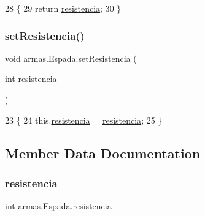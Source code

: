 \begin{DoxyCode}
28     \{
29         \textcolor{keywordflow}{return} \mbox{\hyperlink{classarmas_1_1_espada_a0d0a80a30cfd584c2b50023017919039}{resistencia}};
30     \}
\end{DoxyCode}
\mbox{\label{classarmas_1_1_espada_a276f1d1418d8e991cf3a066d908d9a34}} 
\subsubsection{\texorpdfstring{set\+Resistencia()}{setResistencia()}}
{\footnotesize\ttfamily void armas.\+Espada.\+set\+Resistencia (\begin{DoxyParamCaption}\item[{int}]{resistencia }\end{DoxyParamCaption})\hspace{0.3cm}{\ttfamily [inline]}}


\begin{DoxyCode}
23     \{
24         this.\mbox{\hyperlink{classarmas_1_1_espada_a0d0a80a30cfd584c2b50023017919039}{resistencia}} = \mbox{\hyperlink{classarmas_1_1_espada_a0d0a80a30cfd584c2b50023017919039}{resistencia}};
25     \}
\end{DoxyCode}


\subsection{Member Data Documentation}
\mbox{\label{classarmas_1_1_espada_a0d0a80a30cfd584c2b50023017919039}} 
\subsubsection{\texorpdfstring{resistencia}{resistencia}}
{\footnotesize\ttfamily int armas.\+Espada.\+resistencia\hspace{0.3cm}{\ttfamily [private]}}


